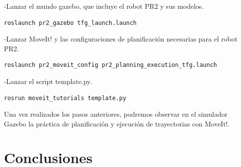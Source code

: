 \documentclass[12pt,spanish,chapterprefix, numbers=noenddot]{book}
\numberwithin{equation}{section}
\numberwithin{figure}{section}
\begin{document}
-Lanzar el mundo gazebo, que incluye el robot PR2 y sus modelos.
\vspace{20pt}
	\begin{lstlisting}[frame=single]
roslaunch pr2_gazebo tfg_launch.launch
    \end{lstlisting}
-Lanzar MoveIt! y las configuraciones de planificación necesarias para el robot PR2.
\vspace{20pt}
	\begin{lstlisting}[frame=single]
roslaunch pr2_moveit_config pr2_planning_execution_tfg.launch
    \end{lstlisting}
-Lanzar el script template.py.
	\begin{lstlisting}[frame=single]
rosrun moveit_tutorials template.py
    \end{lstlisting}
    

Una vez realizados los pasos anteriores, podremos observar en el simulador Gazebo la práctica de planificación y ejecución de trayectorias con MoveIt!. 

\chapter{Conclusiones}

\printbibliography[heading=bibintoc]
\end{document}
